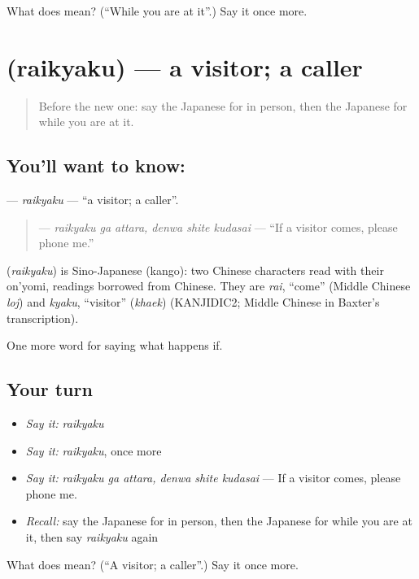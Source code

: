 \begin{tcolorbox}[breakable,colback=teal!4,colframe=teal!35!black,title={Before you move on}]
What does  mean? (\textquotedblleft{}While you are at it\textquotedblright{}.) Say it once more.
\end{tcolorbox}
\section[\texorpdfstring{\ja{らいきゃく} (raikyaku)}{らいきゃく (raikyaku)}]{ (raikyaku) — a visitor; a caller}

\label{lesson:JA-C347-raikyaku}



\begin{quote}
Before the new one: say the Japanese for in person, then the Japanese for while you are at it.
\end{quote}

\subsection*{You'll want to know: }
\textbf{} — \emph{raikyaku} — \textquotedblleft{}a visitor; a caller\textquotedblright{}.

\begin{quote}
\textbf{  } — \emph{raikyaku ga attara, denwa shite kudasai} — \textquotedblleft{}If a visitor comes, please phone me.\textquotedblright{}
\end{quote}

\begin{cousinweb}
\textbf{} (\emph{raikyaku}) is Sino-Japanese (kango): two Chinese characters read with their on'yomi, readings borrowed from Chinese. They are \emph{rai}, \textquotedblleft{}come\textquotedblright{} (Middle Chinese \emph{loj}) and \emph{kyaku}, \textquotedblleft{}visitor\textquotedblright{} (\emph{khaek}) (KANJIDIC2; Middle Chinese in Baxter's transcription).
\end{cousinweb}

\begin{grammarlens}[title={What you've built}]
One more word for saying what happens if.
\end{grammarlens}

\subsection*{Your turn}
\begin{itemize}
\raggedright
  \item \emph{Say it:} \emph{raikyaku}
  \item \emph{Say it:} \emph{raikyaku}, once more
  \item \emph{Say it:} \emph{raikyaku ga attara, denwa shite kudasai} — If a visitor comes, please phone me.
  \item \emph{Recall:} say the Japanese for in person, then the Japanese for while you are at it, then say \emph{raikyaku} again
\end{itemize}

\begin{tcolorbox}[breakable,colback=teal!4,colframe=teal!35!black,title={Before you move on}]
What does  mean? (\textquotedblleft{}A visitor; a caller\textquotedblright{}.) Say it once more.
\end{tcolorbox}
